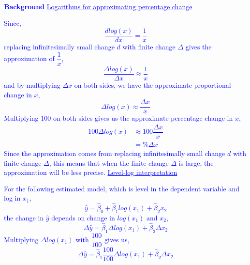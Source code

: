 \documentclass[12pt]{report}
\newenvironment{blueframed}[1][blue]
{\def\FrameCommand{\fboxsep=\FrameSep\fcolorbox{#1}{white}}%
	\MakeFramed {\advance\hsize-\width \FrameRestore}}
{\endMakeFramed}
\begin{document}
\justify
\begin{blueframed}
	\textcolor{blue}{\textbf{Background}}
	\vspace{-\baselineskip}
	\justify
	\textcolor{blue}{\underline{Logarithms for approximating percentage change}}
	
	\noindent \textcolor{blue}
	{
		Since, $$\dfrac{dlog(x)}{dx} = \dfrac{1}{x}$$ replacing infinitesimally small change $d$ with finite change $\Delta$ gives the approximation of $\dfrac{1}{x}$, $$\dfrac{\Delta log(x)}{\Delta x} \approx \dfrac{1}{x}$$ and by multiplying $\Delta x$ on both sides, we have the approximate proportional change in $x$, $$\Delta log(x) \approx \dfrac{\Delta x}{x}$$ Multiplying 100 on both sides gives us the approximate percentage change in $x$, \begin{align*} 
			100\Delta log(x) &\approx 100\dfrac{\Delta x}{x} \\ 
			&= \%\Delta x 
		\end{align*} Since the approximation comes from replacing infinitesimally small change $d$ with finite change $\Delta$, this means that when the finite change $\Delta$ is large, the approximation will be less precise.
	}
	\justify
	\textcolor{blue}{\underline{Level-log interpretation}}
	
	\noindent \textcolor{blue}
	{
		For the following estimated model, which is level in the dependent variable and log in $x_1$, $$\hat{y} = \hat{\beta}_0 + \hat{\beta}_1log(x_1) + \hat{\beta}_2x_2$$ the change in $\hat{y}$ depends on change in $log(x_1)$ and $x_2$, $$\Delta \hat{y} = \hat{\beta}_1\Delta log(x_1) + \hat{\beta}_2\Delta x_2$$ Multiplying $\Delta log(x_1)$ with $\dfrac{100}{100}$ gives us, $$\Delta \hat{y} = \hat{\beta}_1 \dfrac{100}{100}\Delta log(x_1) + \hat{\beta}_2\Delta x_2$$
	}
\end{blueframed}
\end{document}
